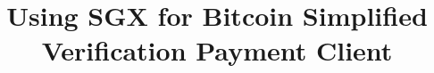 \documentclass[conference]{IEEEtran}
\begin{document}
\title{Using SGX for Bitcoin Simplified Verification Payment Client}
\date{}
\maketitle              %
\begin{abstract}
\end{abstract}
%






{\small


}
\end{document}
